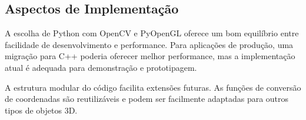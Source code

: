 \subsection{Aspectos de Implementação}

A escolha de Python com OpenCV e PyOpenGL oferece um bom equilíbrio entre facilidade de desenvolvimento e performance. Para aplicações de produção, uma migração para C++ poderia oferecer melhor performance, mas a implementação atual é adequada para demonstração e prototipagem.

A estrutura modular do código facilita extensões futuras. As funções de conversão de coordenadas são reutilizáveis e podem ser facilmente adaptadas para outros tipos de objetos 3D.
